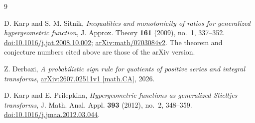 \documentclass[11pt]{amsart}
\begin{document}
\begin{thebibliography}{9}
\small

D. Karp and S. M. Sitnik,
\emph{Inequalities and monotonicity of ratios for generalized hypergeometric
function},
J. Approx. Theory \textbf{161} (2009), no.~1, 337--352.
\href{https://doi.org/10.1016/j.jat.2008.10.002}
{doi:10.1016/j.jat.2008.10.002};
\href{https://arxiv.org/abs/math/0703084}
{arXiv:math/0703084v2}.
The theorem and conjecture numbers cited above are those of the arXiv
version.

Z. Derbazi,
\emph{A probabilistic sign rule for quotients of positive series and integral
transforms},
\href{https://arxiv.org/abs/2607.02511}
{arXiv:2607.02511v1 [math.CA]}, 2026.

D. Karp and E. Prilepkina,
\emph{Hypergeometric functions as generalized Stieltjes transforms},
J. Math. Anal. Appl. \textbf{393} (2012), no.~2, 348--359.
\href{https://doi.org/10.1016/j.jmaa.2012.03.044}
{doi:10.1016/j.jmaa.2012.03.044}.

\end{thebibliography}
\end{document}
